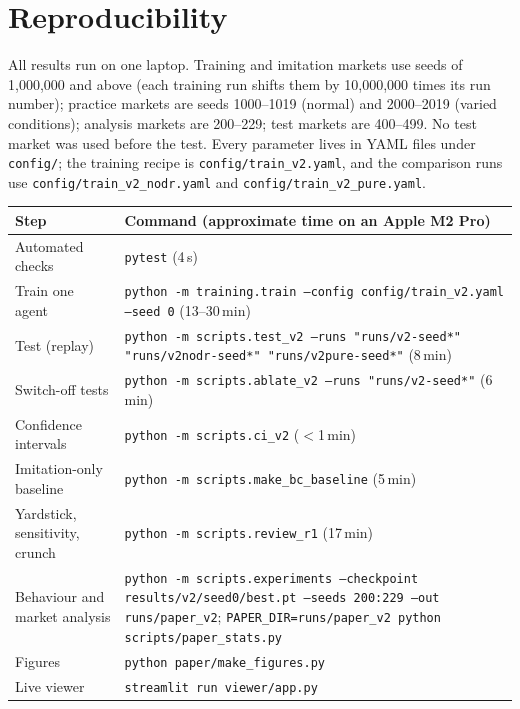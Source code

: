 \documentclass[11pt]{article}
\begin{document}
\section{Reproducibility}

All results run on one laptop. Training and imitation markets use seeds of 1{,}000{,}000 and above (each training run shifts them by 10{,}000{,}000 times its run number); practice markets are seeds 1000--1019 (normal) and 2000--2019 (varied conditions); analysis markets are 200--229; test markets are 400--499. No test market was used before the test. Every parameter lives in YAML files under \texttt{config/}; the training recipe is \texttt{config/train\_v2.yaml}, and the comparison runs use \texttt{config/train\_v2\_nodr.yaml} and \texttt{config/train\_v2\_pure.yaml}.

\begin{table}[h]
\centering
\small
\begin{tabularx}{\linewidth}{lL}
\toprule
Step & Command (approximate time on an Apple M2 Pro) \\
\midrule
Automated checks & \texttt{pytest} (4\,s) \\
Train one agent & \texttt{python -m training.train --config config/train\_v2.yaml --seed 0} (13--30\,min) \\
Test (replay) & \texttt{python -m scripts.test\_v2 --runs "runs/v2-seed*" "runs/v2nodr-seed*" "runs/v2pure-seed*"} (8\,min) \\
Switch-off tests & \texttt{python -m scripts.ablate\_v2 --runs "runs/v2-seed*"} (6\,min) \\
Confidence intervals & \texttt{python -m scripts.ci\_v2} ($<$1\,min) \\
Imitation-only baseline & \texttt{python -m scripts.make\_bc\_baseline} (5\,min) \\
Yardstick, sensitivity, crunch & \texttt{python -m scripts.review\_r1} (17\,min) \\
Behaviour and market analysis & \texttt{python -m scripts.experiments --checkpoint results/v2/seed0/best.pt --seeds 200:229 --out runs/paper\_v2}; \texttt{PAPER\_DIR=runs/paper\_v2 python scripts/paper\_stats.py} \\
Figures & \texttt{python paper/make\_figures.py} \\
Live viewer & \texttt{streamlit run viewer/app.py} \\
\bottomrule
\end{tabularx}
\end{table}
\end{document}
